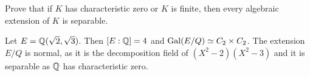 \begin{exercise}
Prove that if $K$ has characteristic zero or $K$ is finite, then 
every algebraic extension of $K$ is separable. 
\end{exercise}


%



%
%
\begin{example}
    Let $E=\mathbb{Q}(\sqrt{2},\sqrt{3})$. Then 
    $[E:\mathbb{Q}]=4$ and 
    $\operatorname{Gal}(E/Q)\simeq C_2\times C_2$. The extension $E/Q$ is normal, 
    as it is the decomposition field of $(X^2-2)(X^2-3)$ and 
    it is separable as $\mathbb{Q}$ has characteristic zero. 
\end{example}

